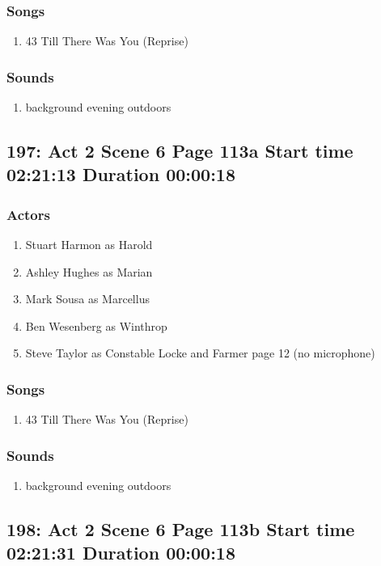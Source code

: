 \subsubsection{Songs}
\begin{enumerate}
\item 43 Till There Was You (Reprise)
\end{enumerate}\subsubsection{Sounds}
\begin{enumerate}
\item background evening outdoors
\end{enumerate}
\subsection{197: Act 2 Scene 6 Page 113a Start time 02:21:13 Duration 00:00:18}

\subsubsection{Actors}
\begin{enumerate}
\item Stuart Harmon as Harold
\item Ashley Hughes as Marian
\item Mark Sousa as Marcellus
\item Ben Wesenberg as Winthrop
\item Steve Taylor as Constable Locke and Farmer page 12 (no microphone)
\end{enumerate}

\subsubsection{Songs}
\begin{enumerate}
\item 43 Till There Was You (Reprise)
\end{enumerate}\subsubsection{Sounds}
\begin{enumerate}
\item background evening outdoors
\end{enumerate}
\subsection{198: Act 2 Scene 6 Page 113b Start time 02:21:31 Duration 00:00:18}
